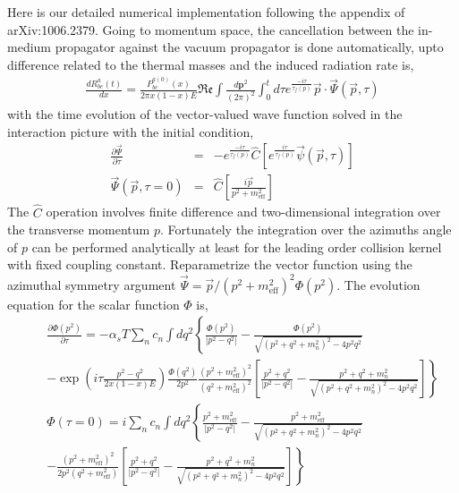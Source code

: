 Here is our detailed numerical implementation following the appendix of arXiv:1006.2379.
Going to momentum space, the cancellation between the in-medium propagator against the vacuum propagator is done automatically, upto difference related to the thermal masses and the induced radiation rate is,
\begin{eqnarray}
\frac{dR^{a}_{bc}(t)}{dx} = \frac{P^{a(0)}_{bc}(x)}{2\pi x(1-x)E} \mathfrak{Re} \int \frac{d\mathbf{p}^2}{(2\pi)^2} \int_0^t d\tau e^{\frac{-i\tau}{\tau_f(p)}} \vec{p}\cdot \vec{\Psi}(\vec{p}, \tau)
\end{eqnarray}
with the time evolution of the vector-valued wave function solved in the interaction picture with the initial condition,
\begin{eqnarray}
\frac{\partial \vec{\Psi}}{\partial \tau} &=& - e^{\frac{-i\tau}{\tau_f(p)}} \hat{C}\left[e^{\frac{i\tau}{\tau_f(p)}}\vec{\psi}(\vec{p}, \tau)\right]\\
\vec{\Psi}(\vec{p}, \tau=0) &=& \hat{C}\left[\frac{i\vec{p}}{p^2+m^2_{\textrm{eff}}}\right]
\end{eqnarray}
The $\hat{C}$ operation involves finite difference and two-dimensional integration over the transverse momentum $p$. 
Fortunately the integration over the azimuths angle of $p$ can be performed analytically at least for the leading order collision kernel with fixed coupling constant.
Reparametrize the vector function using the azimuthal symmetry argument $\vec{\Psi} = \vec{p}/(p^2+m^2_{\textrm{eff}})^2 \Phi(p^2)$.
The evolution equation for the scalar function $\Phi$ is,
\begin{eqnarray}
&&\frac{\partial \Phi(p^2)}{\partial \tau} = - \alpha_s T \sum_n c_n \int dq^2 \left\{\frac{\Phi(p^2)}{|p^2-q^2|} - \frac{\Phi(p^2)}{\sqrt{(p^2+q^2+m_n^2)^2 - 4p^2q^2}}\right. \\\nonumber
&&\left.- \exp\left(i\tau\frac{p^2-q^2}{2x(1-x)E}\right)\frac{\Phi(q^2)}{2p^2}\frac{(p^2+m^2_{\textrm{eff}})^2}{(q^2+m^2_{\textrm{eff}})^2} \left[\frac{p^2+q^2}{|p^2-q^2|} - \frac{p^2+q^2+m_n^2}{\sqrt{(p^2+q^2+m_n^2)^2 - 4p^2q^2}}\right]\right\}\\
&&\Phi(\tau=0)= i\sum_n c_n \int dq^2 \left\{\frac{p^2+m^2_{\textrm{eff}}}{|p^2-q^2|} - \frac{p^2+m^2_{\textrm{eff}}}{\sqrt{(p^2+q^2+m_n^2)^2 - 4p^2q^2}}\right. \\\nonumber
&&\left.-\frac{(p^2+m^2_{\textrm{eff}})^2}{2p^2(q^2+m^2_{\textrm{eff}})} \left[\frac{p^2+q^2}{|p^2-q^2|} - \frac{p^2+q^2+m_n^2}{\sqrt{(p^2+q^2+m_n^2)^2 - 4p^2q^2}}\right]\right\}
\end{eqnarray}

